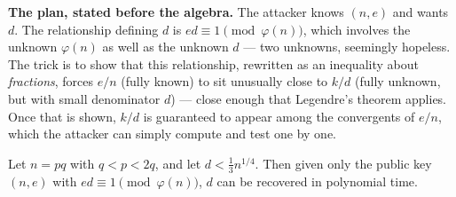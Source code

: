 \medskip\noindent\textbf{The plan, stated before the algebra.} The attacker knows $(n,e)$ and wants $d$. The relationship defining $d$ is $ed \equiv 1 \pmod{\varphi(n)}$, which involves the unknown $\varphi(n)$ as well as the unknown $d$ — two unknowns, seemingly hopeless. The trick is to show that this relationship, rewritten as an inequality about \emph{fractions}, forces $e/n$ (fully known) to sit unusually close to $k/d$ (fully unknown, but with small denominator $d$) — close enough that Legendre's theorem applies. Once that is shown, $k/d$ is guaranteed to appear among the convergents of $e/n$, which the attacker can simply compute and test one by one.

\begin{theorem}[Wiener, 1990]
Let $n = pq$ with $q < p < 2q$, and let $d < \frac{1}{3} n^{1/4}$. Then given only the public key $(n,e)$ with $ed \equiv 1 \pmod{\varphi(n)}$, $d$ can be recovered in polynomial time.
\end{theorem}

